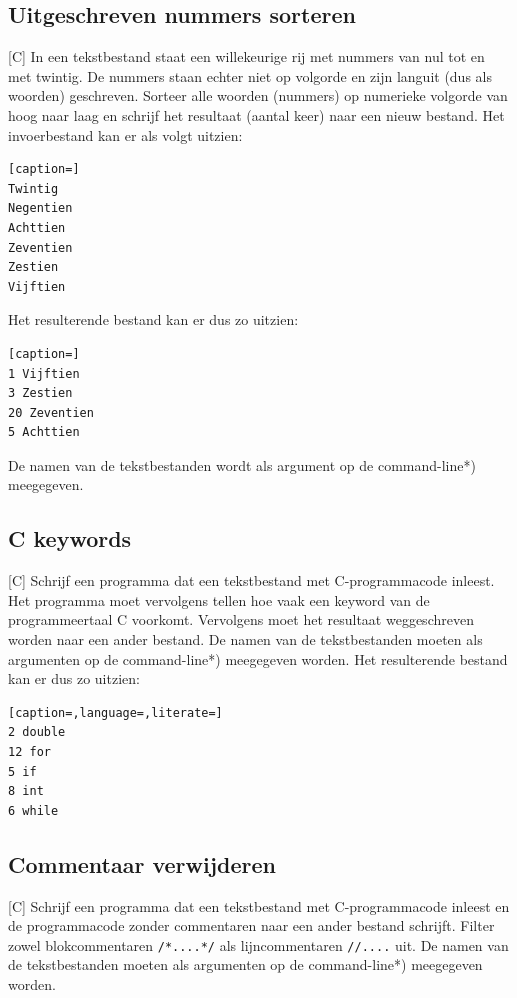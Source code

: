 \documentclass[a4paper,10pt,fleqn,twoside]{article}
\begin{document}
\subsection{Uitgeschreven nummers sorteren}[C]
In een tekstbestand staat een willekeurige rij met nummers van nul tot en met twintig. De nummers staan echter niet op volgorde en zijn languit (dus als woorden) geschreven. Sorteer alle woorden (nummers) op numerieke volgorde van hoog naar laag en schrijf het resultaat (aantal keer) naar een nieuw bestand. Het invoerbestand kan er als volgt uitzien:

\begin{lstlisting}[caption=]
Twintig
Negentien
Achttien
Zeventien
Zestien
Vijftien
\end{lstlisting}

Het resulterende bestand kan er dus zo uitzien:

\begin{lstlisting}[caption=]
1 Vijftien
3 Zestien
20 Zeventien
5 Achttien
\end{lstlisting}

De namen van de tekstbestanden wordt als argument op de command-line*) meegegeven.

\subsection{C keywords}[C]
Schrijf een programma dat een tekstbestand met C-programmacode inleest. Het programma moet vervolgens tellen hoe vaak een keyword van de programmeertaal C voorkomt. Vervolgens moet het resultaat weggeschreven worden naar een ander bestand. De namen van de tekstbestanden moeten als argumenten op de command-line*) meegegeven worden.  Het resulterende bestand kan er dus zo uitzien:

\begin{lstlisting}[caption=,language=,literate=]
2 double
12 for
5 if
8 int
6 while
\end{lstlisting}

\subsection{Commentaar verwijderen}[C]
Schrijf een programma dat een tekstbestand met C-programmacode inleest en de programmacode zonder commentaren naar een ander bestand schrijft. Filter zowel blokcommentaren \lstinline|/*....*/| als lijncommentaren \lstinline|//....| uit. De namen van de tekstbestanden moeten als argumenten op de command-line*) meegegeven worden. 
\end{document}
